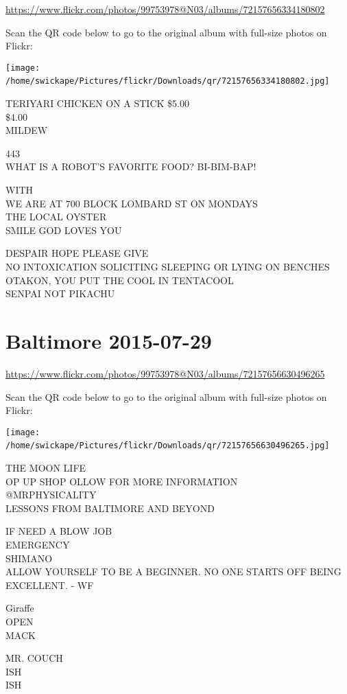 \documentclass[10pt,letterpaper]{article}
\begin{document}
\url{https://www.flickr.com/photos/99753978@N03/albums/72157656334180802}

Scan the QR code below to go to the original album with full-size photos on Flickr:

\texttt{[image: /home/swickape/Pictures/flickr/Downloads/qr/72157656334180802.jpg]}
\

TERIYARI CHICKEN ON A STICK \$5.00\\
\$4.00\\
MILDEW

443\\
WHAT IS A ROBOT'S FAVORITE FOOD?  BI{-}BIM{-}BAP!

WITH\\
WE ARE AT 700 BLOCK LOMBARD ST ON MONDAYS\\
THE LOCAL OYSTER\\
SMILE GOD LOVES YOU

DESPAIR HOPE PLEASE GIVE\\
NO INTOXICATION SOLICITING SLEEPING OR LYING ON BENCHES\\
OTAKON, YOU PUT THE COOL IN TENTACOOL\\
SENPAI NOT PIKACHU
\

\section*{Baltimore 2015-07-29}

\url{https://www.flickr.com/photos/99753978@N03/albums/72157656630496265}

Scan the QR code below to go to the original album with full-size photos on Flickr:

\texttt{[image: /home/swickape/Pictures/flickr/Downloads/qr/72157656630496265.jpg]}
\

THE MOON LIFE\\
OP UP SHOP OLLOW FOR MORE INFORMATION\\
@MRPHYSICALITY\\
LESSONS FROM BALTIMORE AND BEYOND

IF NEED A BLOW JOB\\
EMERGENCY\\
SHIMANO\\
ALLOW YOURSELF TO BE A BEGINNER.  NO ONE STARTS OFF BEING EXCELLENT.  {-} WF

Giraffe\\
OPEN\\
MACK

MR. COUCH\\
ISH\\
ISH
\
\end{document}
